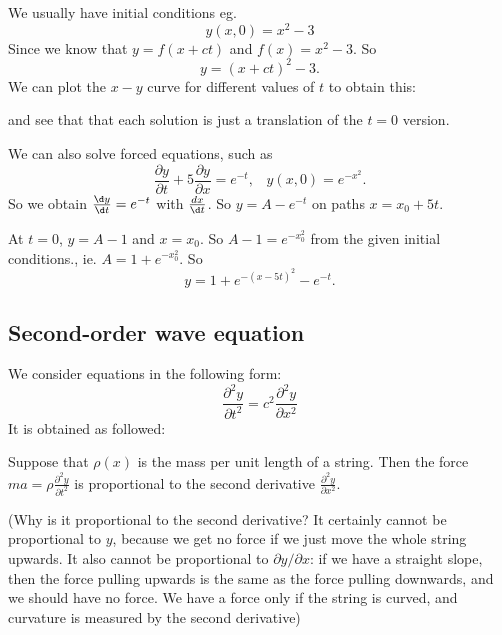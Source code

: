 \documentclass[a4paper]{article}
\begin{document}
    We usually have initial conditions eg.
    \[
      y(x, 0) = x^2 - 3
    \]
    Since we know that $y = f(x + ct)$ and $f(x) = x^2 - 3$. So
    \[
      y = (x + ct)^2 - 3.
    \]
    We can plot the $x-y$ curve for different values of $t$ to obtain this:


    and see that that each solution is just a translation of the $t = 0$ version.

    We can also solve forced equations, such as
    \[
      \frac{\partial y}{\partial t} + 5\frac{\partial y}{\partial x} = e^{-t},\;\;\; y(x, 0) = e^{-x^2}.
    \]
    So we obtain $\frac{\d y}{\d t} = e^{-t}$ with $\frac{d x}{\d t}$. So $y = A - e^{-t}$ on paths $x = x_0 + 5t$.

    At $t = 0$, $y = A - 1$ and $x = x_0$. So $A - 1 = e^{-x_0^2}$ from the given initial conditions., ie. $A = 1 + e^{-x_0^2}$. So
    \[
      y = 1 + e^{-(x - 5t)^2} - e^{-t}.
    \]
    \subsection{Second-order wave equation}
    We consider equations in the following form:
    \[
      \frac{\partial ^2 y}{\partial t^2} = c^2 \frac{\partial^2 y}{\partial x^2}
    \]
    It is obtained as followed:

    \begin{center}
    \end{center}

    Suppose that $\rho(x)$ is the mass per unit length of a string. Then the force $\displaystyle ma = \rho \frac{\partial ^2 y}{\partial t^2}$ is proportional to the second derivative $\displaystyle\frac{\partial^2 y}{\partial x^2}$.

    (Why is it proportional to the second derivative? It certainly cannot be proportional to $y$, because we get no force if we just move the whole string upwards. It also cannot be proportional to $\partial y/\partial x$: if we have a straight slope, then the force pulling upwards is the same as the force pulling downwards, and we should have no force. We have a force only if the string is curved, and curvature is measured by the second derivative)
\end{document}
